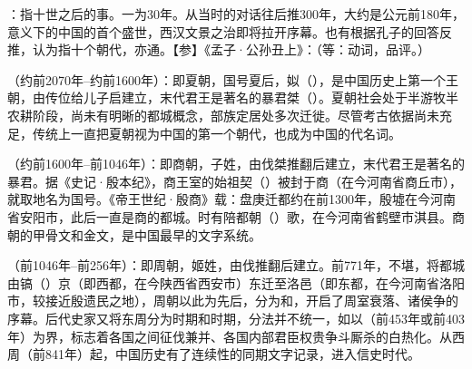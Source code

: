 {
\item {}：指十世之后的事。一为30年。从当时的对话往后推300年，大约是公元前180年，意义下的中国的首个盛世，西汉文景之治即将拉开序幕。也有根据孔子的回答反推，认为指十个朝代，亦通。【参】《孟子·公孙丑上》：（等：动词，品评。）


\item {}（约前2070年--约前1600年）：即夏朝，国号夏后，姒（），是中国历史上第一个王朝，由传位给儿子启建立，末代君王是著名的暴君桀（）。夏朝社会处于半游牧半农耕阶段，尚未有明晰的都城概念，部族定居处多次迁徙。尽管考古依据尚未充足，传统上一直把夏朝视为中国的第一个朝代，也成为中国的代名词。 %

（约前1600年--前1046年）：即商朝，子姓，由伐桀推翻后建立，末代君王是著名的暴君。据《史记·殷本纪》，商王室的始祖契（）被封于商（在今河南省商丘市），就取地名为国号。《帝王世纪·殷商》载：盘庚迁都约在前1300年，殷墟在今河南省安阳市，此后一直是商的都城。时有陪都朝（）歌，在今河南省鹤壁市淇县。商朝的甲骨文和金文，是中国最早的文字系统。%

（前1046年--前256年）：即周朝，姬姓，由伐推翻后建立。前771年，不堪，将都城由镐（）京（即西都，在今陕西省西安市）东迁至洛邑（即东都，在今河南省洛阳市，较接近殷遗民之地），周朝以此为先后，分为和，开启了周室衰落、诸侯争的序幕。后代史家又将东周分为时期和时期，分法并不统一，如以（前453年或前403年）为界，标志着各国之间征伐兼并、各国内部君臣权贵争斗厮杀的白热化。从西周（前841年）起，中国历史有了连续性的同期文字记录，进入信史时代。%

}

